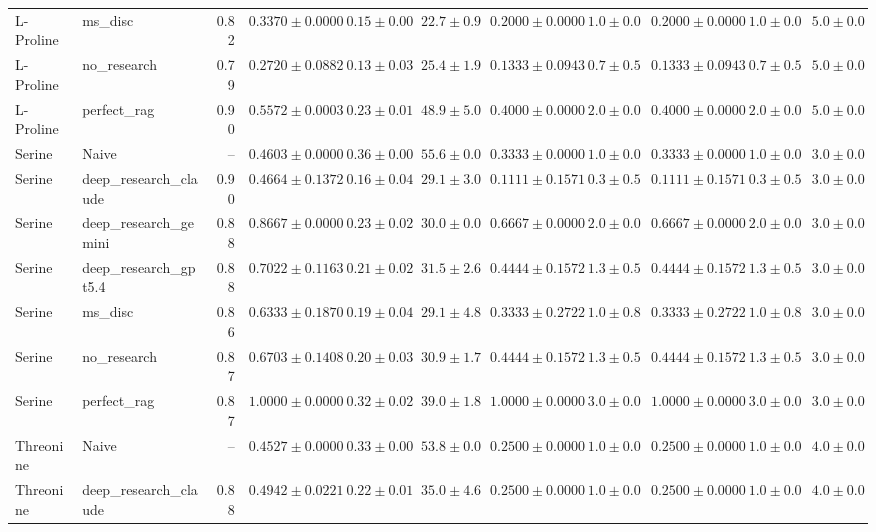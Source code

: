 \begin{table}[htbp]
\begin{tabular}{llrrrrrrrrr}
L-Proline & ms_disc & 0.82 & $0.3370 \pm 0.0000$ & $0.15 \pm 0.00$ & $22.7 \pm 0.9$ & $0.2000 \pm 0.0000$ & $1.0 \pm 0.0$ & $0.2000 \pm 0.0000$ & $1.0 \pm 0.0$ & $5.0 \pm 0.0$ \\
L-Proline & no_research & 0.79 & $0.2720 \pm 0.0882$ & $0.13 \pm 0.03$ & $25.4 \pm 1.9$ & $0.1333 \pm 0.0943$ & $0.7 \pm 0.5$ & $0.1333 \pm 0.0943$ & $0.7 \pm 0.5$ & $5.0 \pm 0.0$ \\
L-Proline & perfect_rag & 0.90 & \cellcolor{green!25}$0.5572 \pm 0.0003$ & $0.23 \pm 0.01$ & $48.9 \pm 5.0$ & $0.4000 \pm 0.0000$ & $2.0 \pm 0.0$ & $0.4000 \pm 0.0000$ & $2.0 \pm 0.0$ & $5.0 \pm 0.0$ \\
\midrule
Serine & Naive & -- & \cellcolor{red!25}$0.4603 \pm 0.0000$ & $0.36 \pm 0.00$ & $55.6 \pm 0.0$ & $0.3333 \pm 0.0000$ & $1.0 \pm 0.0$ & $0.3333 \pm 0.0000$ & $1.0 \pm 0.0$ & $3.0 \pm 0.0$ \\
Serine & deep_research_claude & 0.90 & $0.4664 \pm 0.1372$ & $0.16 \pm 0.04$ & $29.1 \pm 3.0$ & $0.1111 \pm 0.1571$ & $0.3 \pm 0.5$ & $0.1111 \pm 0.1571$ & $0.3 \pm 0.5$ & $3.0 \pm 0.0$ \\
Serine & deep_research_gemini & 0.88 & $0.8667 \pm 0.0000$ & $0.23 \pm 0.02$ & $30.0 \pm 0.0$ & $0.6667 \pm 0.0000$ & $2.0 \pm 0.0$ & $0.6667 \pm 0.0000$ & $2.0 \pm 0.0$ & $3.0 \pm 0.0$ \\
Serine & deep_research_gpt5.4 & 0.88 & $0.7022 \pm 0.1163$ & $0.21 \pm 0.02$ & $31.5 \pm 2.6$ & $0.4444 \pm 0.1572$ & $1.3 \pm 0.5$ & $0.4444 \pm 0.1572$ & $1.3 \pm 0.5$ & $3.0 \pm 0.0$ \\
Serine & ms_disc & 0.86 & $0.6333 \pm 0.1870$ & $0.19 \pm 0.04$ & $29.1 \pm 4.8$ & $0.3333 \pm 0.2722$ & $1.0 \pm 0.8$ & $0.3333 \pm 0.2722$ & $1.0 \pm 0.8$ & $3.0 \pm 0.0$ \\
Serine & no_research & 0.87 & $0.6703 \pm 0.1408$ & $0.20 \pm 0.03$ & $30.9 \pm 1.7$ & $0.4444 \pm 0.1572$ & $1.3 \pm 0.5$ & $0.4444 \pm 0.1572$ & $1.3 \pm 0.5$ & $3.0 \pm 0.0$ \\
Serine & perfect_rag & 0.87 & \cellcolor{green!25}$1.0000 \pm 0.0000$ & $0.32 \pm 0.02$ & $39.0 \pm 1.8$ & $1.0000 \pm 0.0000$ & $3.0 \pm 0.0$ & $1.0000 \pm 0.0000$ & $3.0 \pm 0.0$ & $3.0 \pm 0.0$ \\
\midrule
Threonine & Naive & -- & \cellcolor{red!25}$0.4527 \pm 0.0000$ & $0.33 \pm 0.00$ & $53.8 \pm 0.0$ & $0.2500 \pm 0.0000$ & $1.0 \pm 0.0$ & $0.2500 \pm 0.0000$ & $1.0 \pm 0.0$ & $4.0 \pm 0.0$ \\
Threonine & deep_research_claude & 0.88 & $0.4942 \pm 0.0221$ & $0.22 \pm 0.01$ & $35.0 \pm 4.6$ & $0.2500 \pm 0.0000$ & $1.0 \pm 0.0$ & $0.2500 \pm 0.0000$ & $1.0 \pm 0.0$ & $4.0 \pm 0.0$ \\

\end{tabular}
\end{table}
